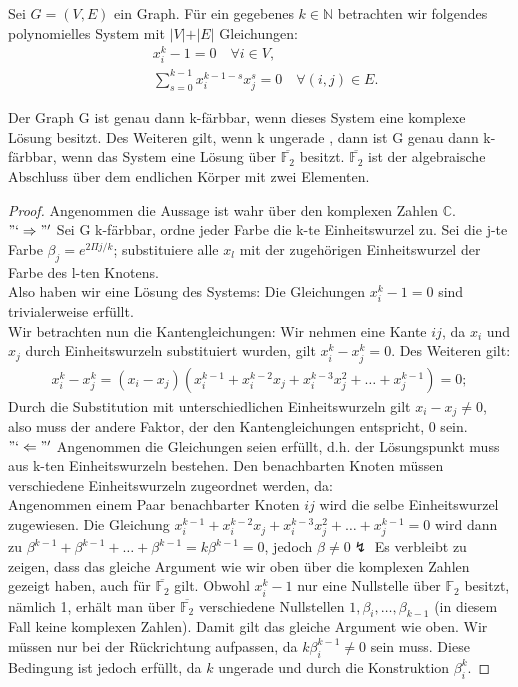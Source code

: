 \begin{lemma} \label{3color}
Sei $G = (V, E)$ ein Graph. Für ein gegebenes $k \in \mathbb{N}$ betrachten wir folgendes polynomielles System mit $\vert V \vert + \vert E \vert$ Gleichungen:
\begin{align*}
&x_i^k - 1 = 0 \quad \forall i \in V, \\
& \sum_{s = 0}^{k-1} x_i^{k-1-s}x_j^s = 0 \quad \forall (i,j) \in E.
\end{align*} 

\noindent Der Graph G ist genau dann k-färbbar, wenn dieses System eine komplexe Lösung besitzt. Des Weiteren gilt, wenn k ungerade , dann ist G genau dann k-färbbar, wenn das System eine Lösung über $\overline{\mathbb{F}_2}$ besitzt. $\overline{\mathbb{F}_2}$ ist der algebraische Abschluss über dem endlichen Körper mit zwei Elementen.
\end{lemma}

\begin{proof}
Angenommen die Aussage ist wahr über den komplexen Zahlen $\mathbb{C}$. 
\\ $"`\Rightarrow"'$ Sei G k-färbbar, ordne jeder Farbe die k-te Einheitswurzel zu. Sei die j-te Farbe $\beta_j = e^{2\Pi j/k}$; substituiere alle $x_l$ mit der zugehörigen Einheitswurzel der Farbe des l-ten Knotens. \\Also haben wir eine Lösung des Systems: Die Gleichungen $x_i^k-1 = 0$ sind trivialerweise erfüllt. \\Wir betrachten nun die Kantengleichungen: Wir nehmen eine Kante $ij$, da $x_i$ und $x_j$ durch Einheitswurzeln substituiert wurden, gilt $x_i^k - x_j^k = 0$. Des Weiteren gilt: 
\begin{align*}
x_i^k-x_j^k = (x_i-x_j)(x_i^{k-1}+x_i^{k-2}x_j+x_i^{k-3}x_j^2+\ldots+x_j^{k-1}) = 0;
\end{align*}   
Durch die Substitution mit unterschiedlichen Einheitswurzeln gilt $x_i - x_j \neq 0$, also muss der andere Faktor, der den Kantengleichungen entspricht, 0 sein.  
\\ $"`\Leftarrow"'$ Angenommen die Gleichungen seien erfüllt, d.h. der Lösungspunkt muss aus k-ten Einheitswurzeln bestehen. Den benachbarten Knoten müssen verschiedene Einheitswurzeln zugeordnet werden, da: \\
Angenommen einem Paar benachbarter Knoten $ij$ wird die selbe Einheitswurzel zugewiesen. Die Gleichung $x_i^{k-1}+x_i^{k-2}x_j+x_i^{k-3}x_j^2+\ldots+x_j^{k-1} = 0$ wird dann zu $\beta^{k-1}+\beta^{k-1}+\ldots+\beta^{k-1} = k\beta^{k-1} = 0$, jedoch $\beta \neq 0 \lightning$ 
Es verbleibt zu zeigen, dass das gleiche Argument wie wir oben über die komplexen Zahlen gezeigt haben, auch für $\overline{\mathbb{F}_2}$ gilt. Obwohl $x_i^k - 1$ nur eine Nullstelle über $\mathbb{F}_2$ besitzt, nämlich 1, erhält man über $\overline{\mathbb{F}_2}$ verschiedene Nullstellen $1,\beta_i,\ldots,\beta_{k-1}$ (in diesem Fall keine komplexen Zahlen). Damit gilt das gleiche Argument wie oben. Wir müssen nur bei der Rückrichtung aufpassen, da $k\beta_i^{k-1} \neq 0$ sein muss. Diese Bedingung ist jedoch erfüllt, da $k$ ungerade und durch die Konstruktion $\beta_i^k$. 
\end{proof}




